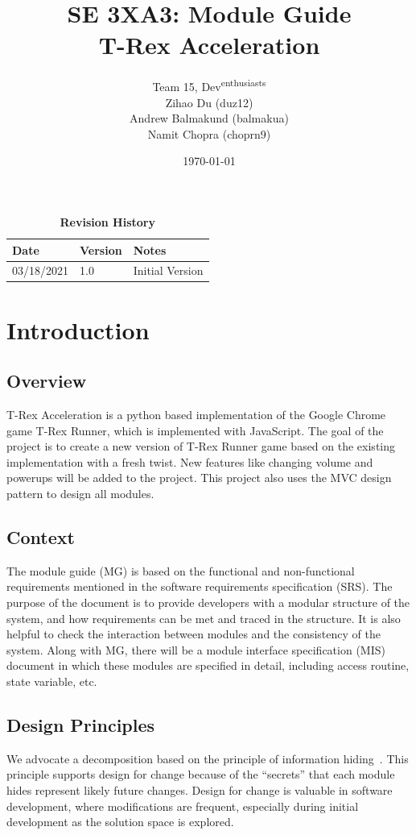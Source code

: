 \documentclass[12pt, titlepage]{article}
\title{SE 3XA3: Module Guide\\T-Rex Acceleration}
\author{Team 15, Dev\textsuperscript{enthusiasts}
		\\ Zihao Du (duz12)
		\\ Andrew Balmakund (balmakua) 
		\\ Namit Chopra (choprn9)
}
\date{\today}
\begin{document}
\maketitle

\tableofcontents
\listoftables
\listoffigures

\begin{table}[bp]
\caption{\bf Revision History}
\begin{tabularx}{\textwidth}{p{3cm}p{2cm}X}
\toprule {\bf Date} & {\bf Version} & {\bf Notes}\\
\midrule
03/18/2021 & 1.0 & Initial Version\\
\bottomrule
\end{tabularx}
\end{table}

\newpage


\section{Introduction}
\subsection*{Overview}
T-Rex Acceleration is a python based implementation of the Google Chrome game T-Rex Runner, which is implemented with JavaScript. The goal of the project is to create a new version of T-Rex Runner game based on the existing implementation with a fresh twist. New features like changing volume and powerups will be added to the project. This project also uses the MVC design pattern to design all modules.
\subsection*{Context}
The module guide (MG) is based on the functional and non-functional requirements mentioned in the software requirements specification (SRS). The purpose of the document is to provide developers with a modular structure of the system, and how requirements can be met and traced in the structure. It is also helpful to check the interaction between modules and the consistency of the system. Along with MG, there will be a module interface specification (MIS) document in which these modules are specified in detail, including access routine, state variable, etc.
\subsection*{Design Principles}
We advocate a decomposition based on the principle of information hiding~\citep{Parnas1972a}. This
principle supports design for change because of the ``secrets'' that each module hides represent likely future changes. Design for change is valuable in software development, where modifications are frequent, especially during initial development as the solution space is explored.  
\end{document}
